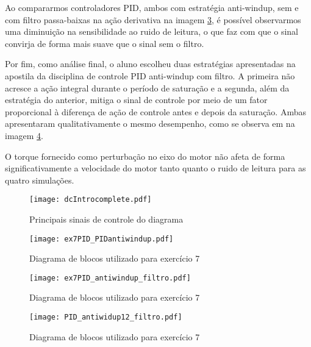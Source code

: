 Ao compararmos controladores PID, ambos com estratégia anti-windup, sem e com filtro passa-baixas na ação derivativa na imagem \ref{fig:PIDfiltro}, é possível observarmos uma diminuição na sensibilidade ao ruido de leitura, o que faz com que o sinal convirja de forma mais suave que o sinal sem o filtro.

Por fim, como análise final, o aluno escolheu duas estratégias apresentadas na apostila da disciplina de controle PID anti-windup com filtro. A primeira não acresce a ação integral durante o período de saturação e a segunda, além da estratégia do anterior, mitiga o sinal de controle por meio de um fator proporcional à diferença de ação de controle antes e depois da saturação. Ambas apresentaram qualitativamente o mesmo desempenho, como se observa em na imagem \ref{fig:PIDantiwindup12}.

O torque fornecido como perturbação no eixo do motor não afeta de forma  significativamente a velocidade do motor tanto quanto o ruido de leitura para as quatro simulações.

\begin{figure}[!h]
    \center
    \texttt{[image: dcIntrocomplete.pdf]}
    \caption{Principais sinais de controle do diagrama} 
    \label{fig:dcIntrocomplete}
\end{figure}

\begin{figure}[H]
    \center
    \texttt{[image: ex7PID\_PIDantiwindup.pdf]}
    \caption{Diagrama de blocos utilizado para exercício 7}
    \label{fig:PIDantiwindup}
\end{figure}

\begin{figure}[H]
    \center
    \texttt{[image: ex7PID\_antiwindup\_filtro.pdf]}
    \caption{Diagrama de blocos utilizado para exercício 7}
    \label{fig:PIDfiltro}
\end{figure}

\begin{figure}[H]
    \center
    \texttt{[image: PID\_antiwidup12\_filtro.pdf]}
    \caption{Diagrama de blocos utilizado para exercício 7}
    \label{fig:PIDantiwindup12}
\end{figure}
